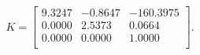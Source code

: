 \begin{equation*}
K = 
\begin{bmatrix}
  9.3247 &  -0.8647 & -160.3975 \\
  0.0000 &   2.5373 &   0.0664 \\
  0.0000 &   0.0000 &   1.0000 \\
\end{bmatrix}.
\end{equation*}
